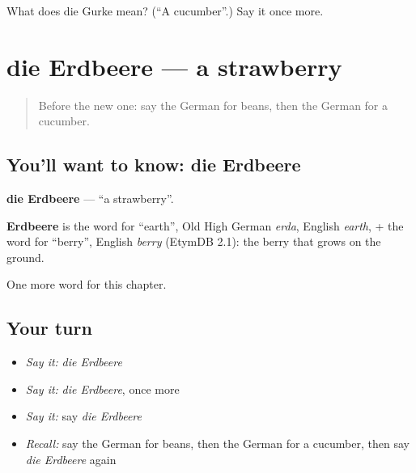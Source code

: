 \begin{tcolorbox}[breakable,colback=teal!4,colframe=teal!35!black,title={Before you move on}]
What does die Gurke mean? (\textquotedblleft{}A cucumber\textquotedblright{}.) Say it once more.
\end{tcolorbox}
\section[die Erdbeere]{die Erdbeere — a strawberry}

\label{lesson:GE-C121-erdbeere}



\begin{quote}
Before the new one: say the German for beans, then the German for a cucumber.
\end{quote}

\subsection*{You'll want to know: die Erdbeere}
\textbf{die Erdbeere} — \textquotedblleft{}a strawberry\textquotedblright{}.

\begin{cousinweb}
\textbf{Erdbeere} is the word for \textquotedblleft{}earth\textquotedblright{}, Old High German \emph{erda}, English \emph{earth}, + the word for \textquotedblleft{}berry\textquotedblright{}, English \emph{berry} (EtymDB 2.1): the berry that grows on the ground.
\end{cousinweb}

\begin{grammarlens}[title={What you've built}]
One more word for this chapter.
\end{grammarlens}

\subsection*{Your turn}
\begin{itemize}
\raggedright
  \item \emph{Say it:} \emph{die Erdbeere}
  \item \emph{Say it:} \emph{die Erdbeere}, once more
  \item \emph{Say it:} say \emph{die Erdbeere}
  \item \emph{Recall:} say the German for beans, then the German for a cucumber, then say \emph{die Erdbeere} again
\end{itemize}

